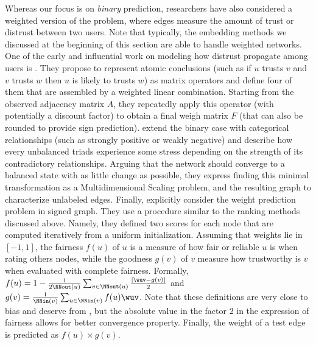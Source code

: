 \begin{newcontent}
Whereas our focus is on \emph{binary} prediction, researchers have also considered a weighted
version of the problem, where edges measure the amount of trust or distrust between two users. Note
that typically, the embedding methods we discussed at the beginning of this section are able to
handle weighted networks.
%
One of the early and influential work on modeling how distrust propagate among users is
\autocite{guha2004propagation}. They propose to represent atomic conclusions (such as if $u$ trusts
$v$ and $v$ trusts $w$ then $u$ is likely to trusts $w$) as matrix operators and define four of them
that are assembled by a weighted linear combination. Starting from the observed adjacency matrix
$A$, they repeatedly apply this operator (with potentially a discount factor) to obtain a final
weigh matrix $F$ (that can also be rounded to provide sign prediction).
%
\Textcite{Qian2014sn} extend the binary case with categorical relationships (such as strongly
positive or weakly negative) and describe how every unbalanced triads experience some stress
depending on the strength of its contradictory relationships. Arguing that the network should
converge to a balanced state with as little change as possible, they express finding this minimal
transformation as a Multidimensional Scaling problem, and the resulting graph to characterize
unlabeled edges.
%
Finally, \textcite{edgeWeights16} explicitly consider the weight prediction problem in signed graph.
They use a procedure similar to the ranking methods discussed above. Namely, they defined two scores
for each node that are computed iteratively from a uniform initialization. Assuming that weights lie
in $[-1,1]$, the fairness $f(u)$ of $u$ is a measure of how fair or reliable $u$ is when rating
others nodes, while the goodness $g(v)$ of $v$ measure how trustworthy is $v$ when evaluated with
complete fairness.  Formally, $f(u) =  1 - \frac{1}{2\NNout(u)} \sum_{v\in\NNout(u)}
\frac{|\wuv-g(v)|}{2}$ and $g(v) = \frac{1}{\NNin(v)}\sum_{u\in\NNin(v)}f(u)\wuv$. Note that these
definitions are very close to bias and deserve from \textcite{mishra2011finding}, but the absolute
value in the factor $2$ in the expression of fairness allows for better convergence property.
Finally, the weight of a test edge \euv is predicted as $f(u)\times g(v)$.

\medskip


\end{newcontent}
